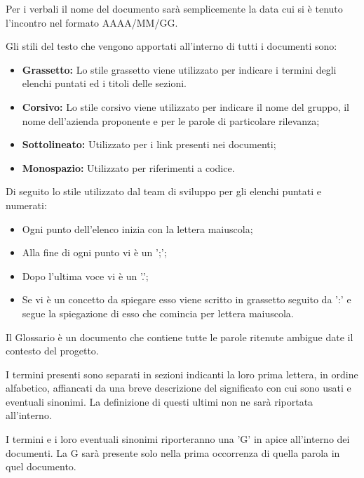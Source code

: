     Per i verbali il nome del documento sarà semplicemente la data cui si è tenuto l'incontro nel formato AAAA/MM/GG.

    
    Gli stili del testo che vengono apportati all’interno di tutti i documenti sono:

    \begin{itemize}
      \item \textbf{Grassetto:} Lo stile grassetto viene utilizzato per indicare i termini degli elenchi puntati ed i titoli delle sezioni.
      \item \textbf{Corsivo:} Lo stile corsivo viene utilizzato per indicare il nome del gruppo, il nome dell'azienda proponente e per le parole di particolare rilevanza;
      \item \textbf{Sottolineato:} Utilizzato per i link presenti nei documenti;
      \item \textbf{Monospazio:} Utilizzato per riferimenti a codice.
    \end{itemize}


    Di seguito lo stile utilizzato dal team di sviluppo per gli elenchi puntati e numerati:
    \begin{itemize}
      \item Ogni punto dell'elenco inizia con la lettera maiuscola;
      \item Alla fine di ogni punto vi è un ';';
      \item Dopo l'ultima voce vi è un '.';
      \item Se vi è un concetto da spiegare esso viene scritto in grassetto seguito da ':' e segue la spiegazione di esso che comincia per lettera maiuscola.
    \end{itemize}

    Il Glossario è un documento che contiene tutte le parole ritenute ambigue date il contesto del progetto.

    I termini presenti sono separati in sezioni indicanti la loro prima lettera, in ordine alfabetico, affiancati
    da una breve descrizione del significato con cui sono usati e eventuali sinonimi.
    La definizione di questi ultimi non ne sarà riportata all'interno.

    I termini e i loro eventuali sinonimi riporteranno una 'G' in apice all'interno dei documenti. La G sarà
    presente solo nella prima occorrenza di quella parola in quel documento.

